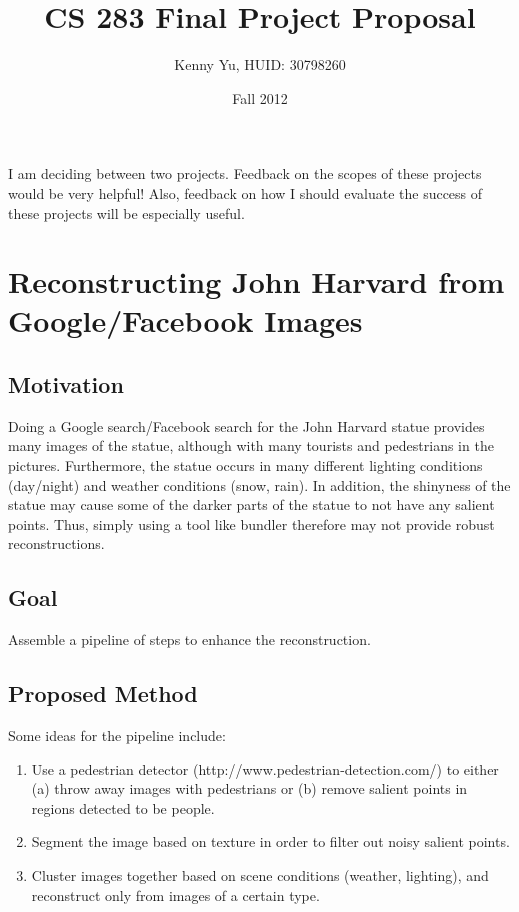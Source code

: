 \documentclass[12pt]{article}
\begin{document}
\title{CS 283 Final Project Proposal}
\date{Fall 2012}
\author{Kenny Yu, HUID: 30798260}

\maketitle

I am deciding between two projects. Feedback on the scopes of these projects would be very helpful! Also, feedback on how I should evaluate the success of these projects will be especially useful.

\section{Reconstructing John Harvard from Google/Facebook Images}

\subsection{Motivation}
Doing a Google search/Facebook search for the John Harvard statue provides many images of the statue, although with many tourists and pedestrians in the pictures. Furthermore, the statue occurs in many different lighting conditions (day/night) and weather conditions (snow, rain). In addition, the shinyness of the statue may cause some of the darker parts of the statue to not have any salient points. Thus, simply using a tool like bundler therefore may not provide robust reconstructions.

\subsection{Goal}
Assemble a pipeline of steps to enhance the reconstruction.

\subsection{Proposed Method}
Some ideas for the pipeline include:
\begin{enumerate}
\item Use a pedestrian detector (http://www.pedestrian-detection.com/) to either (a) throw away images with pedestrians or (b) remove salient points in regions detected to be people.
\item Segment the image based on texture in order to filter out noisy salient points.
\item Cluster images together based on scene conditions (weather, lighting), and reconstruct only from images of a certain type.
\end{enumerate}
\end{document}
